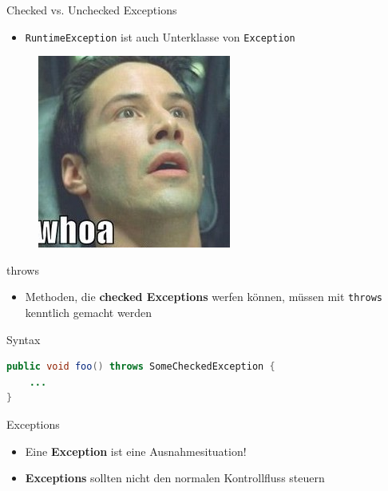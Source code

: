 \documentclass[18pt]{beamer}
\begin{document}
\begin{frame}{Checked vs. Unchecked Exceptions}

    \begin{itemize}
        \item \texttt{RuntimeException} ist auch Unterklasse von \texttt{Exception}
    \end{itemize}


    \vspace{.2in}

    \begin{figure}
        \includegraphics[scale=.5]{img/whoa.jpg}
    \end{figure}

\end{frame}

\begin{frame}[fragile]{throws}

    \begin{itemize}
        \item Methoden, die \textbf{checked Exceptions} werfen können, müssen mit \texttt{throws} kenntlich gemacht werden
    \end{itemize}


    \begin{exampleblock}{Syntax}
        \begin{lstlisting}[language=Java,basicstyle=\scriptsize]
public void foo() throws SomeCheckedException {
    ...
}
        \end{lstlisting}

    \end{exampleblock}

\end{frame}

\begin{frame}{Exceptions}
    \begin{itemize}
        \item Eine \textbf{Exception} ist eine \alert{Ausnahmesituation!}
        \item \textbf{Exceptions} sollten nicht den normalen Kontrollfluss steuern
    \end{itemize}
\end{frame}
\end{document}
